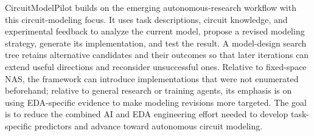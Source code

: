 CircuitModelPilot builds on the emerging autonomous-research workflow with this circuit-modeling focus. It uses task descriptions, circuit knowledge, and experimental feedback to analyze the current model, propose a revised modeling strategy, generate its implementation, and test the result. A model-design search tree retains alternative candidates and their outcomes so that later iterations can extend useful directions and reconsider unsuccessful ones. Relative to fixed-space NAS, the framework can introduce implementations that were not enumerated beforehand; relative to general research or training agents, its emphasis is on using EDA-specific evidence to make modeling revisions more targeted. The goal is to reduce the combined AI and EDA engineering effort needed to develop task-specific predictors and advance toward autonomous circuit modeling.
